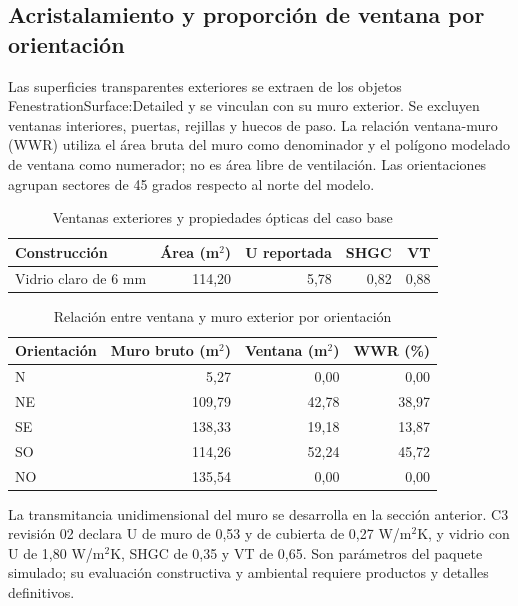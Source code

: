 \par\medskip
\subsection{Acristalamiento y proporción de ventana por orientación}
Las superficies transparentes exteriores se extraen de los objetos FenestrationSurface:Detailed y se vinculan con su muro exterior. Se excluyen ventanas interiores, puertas, rejillas y huecos de paso. La relación ventana-muro (WWR) utiliza el área bruta del muro como denominador y el polígono modelado de ventana como numerador; no es área libre de ventilación. Las orientaciones agrupan sectores de 45 grados respecto al norte del modelo.
\begin{table}[H]\centering\caption{Ventanas exteriores y propiedades ópticas del caso base}
{\small\singlespacing\begin{tabular}{p{4.6cm}rrrr}\toprule
Construcción & Área (m$^2$) & U reportada & SHGC & VT \\ \midrule
Vidrio claro de 6 mm & 114,20 & 5,78 & 0,82 & 0,88 \\
\bottomrule\end{tabular}}
\end{table}
\begin{table}[H]\centering\caption{Relación entre ventana y muro exterior por orientación}
{\small\singlespacing\begin{tabular}{lrrr}\toprule
Orientación & Muro bruto (m$^2$) & Ventana (m$^2$) & WWR (\%) \\ \midrule
N & 5,27 & 0,00 & 0,00 \\
NE & 109,79 & 42,78 & 38,97 \\
SE & 138,33 & 19,18 & 13,87 \\
SO & 114,26 & 52,24 & 45,72 \\
NO & 135,54 & 0,00 & 0,00 \\
\bottomrule\end{tabular}}
\end{table}
La transmitancia unidimensional del muro se desarrolla en la sección anterior. C3 revisión 02 declara U de muro de 0,53 y de cubierta de 0,27 W/m$^2$K, y vidrio con U de 1,80 W/m$^2$K, SHGC de 0,35 y VT de 0,65. Son parámetros del paquete simulado; su evaluación constructiva y ambiental requiere productos y detalles definitivos.

